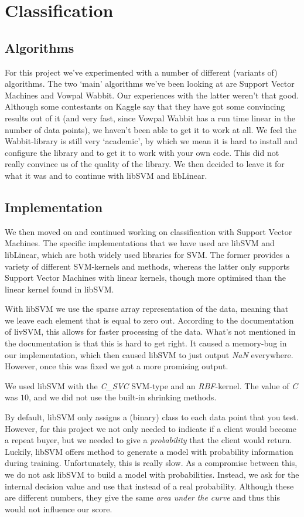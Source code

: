 \documentclass[a4paper]{article}
\begin{document}
\section{Classification}
\subsection{Algorithms}
For this project we've experimented with a number of different (variants of) algorithms. The two `main' algorithms we've been looking at are Support Vector Machines and Vowpal Wabbit. Our experiences with the latter weren't that good. Although some contestants on Kaggle say that they have got some convincing results out of it (and very fast, since Vowpal Wabbit has a run time linear in the number of data points), we haven't been able to get it to work at all. We feel the Wabbit-library is still very `academic', by which we mean it is hard to install and configure the library and to get it to work with your own code. This did not really convince us of the quality of the library. We then decided to leave it for what it was and to continue with libSVM and libLinear.
\subsection{Implementation}
We then moved on and continued working on classification with Support Vector Machines. The specific implementations that we have used are libSVM and libLinear, which are both widely used libraries for SVM. The former provides a variety of different SVM-kernels and methods, whereas the latter only supports Support Vector Machines with linear kernels, though more optimised than the linear kernel found in libSVM.

With libSVM we use the sparse array representation of the data, meaning that we leave each element that is equal to zero out. According to the documentation of livSVM, this allows for faster processing of the data. What's not mentioned in the documentation is that this is hard to get right. It caused a memory-bug in our implementation, which then caused libSVM to just output \emph{NaN} everywhere. However, once this was fixed we got a more promising output.

We used libSVM with the \emph{C\_SVC} SVM-type and an \emph{RBF}-kernel. The value of \emph{C} was $10$, and we did not use the built-in shrinking methods.

By default, libSVM only assigns a (binary) class to each data point that you test. However, for this project we not only needed to indicate if a client would become a repeat buyer, but we needed to give a \emph{probability} that the client would return. Luckily, libSVM offers method to generate a model with probability information during training. Unfortunately, this is really slow. As a compromise between this, we do not ask libSVM to build a model with probabilities. Instead, we ask for the internal decision value and use that instead of a real probability. Although these are different numbers, they give the same \emph{area under the curve} and thus this would not influence our score.
\end{document}
